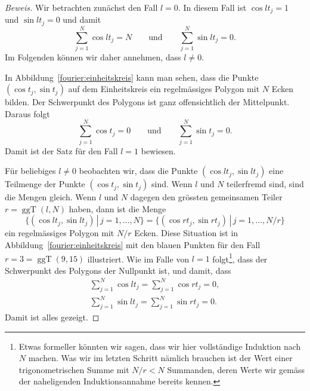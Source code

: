 \begin{proof}[Beweis]
Wir betrachten zunächst den Fall $l=0$.
In diesem Fall ist $\cos lt_j=1$ und $\sin lt_j=0$ und damit
\[
\sum_{j=1}^N \cos lt_j = N
\qquad\text{und}\qquad
\sum_{j=1}^N \sin lt_j = 0.
\]
Im Folgenden können wir daher annehmen, dass $l\ne 0$.

In Abbildung~\eqref{fourier:einheitskreis} kann man sehen, dass die Punkte
$(\cos t_j,\sin t_j)$ auf dem Einheitskreis ein regelmässiges Polygon
mit $N$ Ecken bilden.
Der Schwerpunkt des Polygons ist ganz offensichtlich der Mittelpunkt.
Daraus folgt
\[
\sum_{j=1}^N \cos t_j = 0
\qquad\text{und}\qquad
\sum_{j=1}^N \sin t_j = 0.
\]
Damit ist der Satz für den Fall $l=1$ bewiesen.

Für beliebiges $l\ne 0$ beobachten wir, dass die Punkte 
$(\cos lt_j,\sin lt_j)$ eine Teilmenge der Punkte $(\cos t_j, \sin t_j)$
sind.
Wenn $l$ und $N$ teilerfremd sind, sind die Mengen gleich.
Wenn $l$ und $N$ dagegen den grössten gemeinsamen Teiler
$r=\operatorname{ggT}(l,N)$ haben, dann
ist die Menge 
\[
\{ 
(\cos lt_j,\sin lt_j)\,|\,j=1,\dots,N
\}
=
\{
(\cos rt_j,\sin rt_j)\,|\,j=1,\dots,N/r
\}
\]
ein regelmässiges Polygon mit $N/r$ Ecken.
Diese Situation ist in Abbildung~\ref{fourier:einheitskreis} mit den
blauen Punkten für den Fall $r=3=\operatorname{ggT}(9,15)$
illustriert.
Wie im Falle von $l=1$ folgt\footnote{Etwas formeller könnten wir sagen,
dass wir hier vollständige Induktion nach $N$ machen.
Was wir im letzten Schritt nämlich brauchen ist der Wert einer
trigonometrischen Summe mit $N/r<N$ Summanden, deren Werte wir gemäss
der naheligenden Induktionsannahme bereits kennen.},
dass der Schwerpunkt des Polygons der
Nullpunkt ist, und damit, dass
\begin{align*}
\sum_{j=1}^N \cos lt_j 
=
\sum_{j=1}^N \cos rt_j 
=
0,
\\
\sum_{j=1}^N \sin lt_j 
=
\sum_{j=1}^N \sin rt_j 
=
0.
\end{align*}
Damit ist alles gezeigt.
\end{proof}

